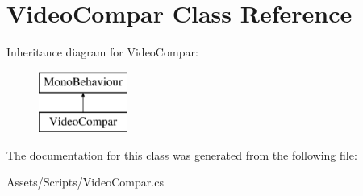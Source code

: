 \hypertarget{class_video_compar}{}\section{Video\+Compar Class Reference}
\label{class_video_compar}
Inheritance diagram for Video\+Compar\+:\begin{figure}[H]
\begin{center}
\leavevmode
\includegraphics[height=2.000000cm]{class_video_compar}
\end{center}
\end{figure}


The documentation for this class was generated from the following file\+:\begin{DoxyCompactItemize}
\item 
Assets/\+Scripts/Video\+Compar.\+cs\end{DoxyCompactItemize}
